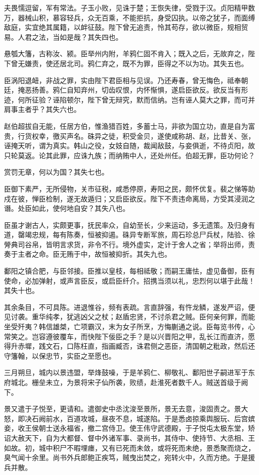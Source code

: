 \documentclass[12pt,UTF8]{ctexbook}
\begin{document}
夫畏懦逗留，军有常法。子玉小败，见诛于楚；王恢失律，受戮于汉。贞阳精甲数万，器械山积，慕容轻兵，众无百乘，不能拒抗，身受囚执。以帝之犹子，而面缚敌庭，实宜绝其属籍，以衅征鼓。陛下曾无追责，怜其苟存，欲以微臣，规相贸易。人君之法，当如是哉？其失四也。

悬瓠大籓，古称汝、颍。臣举州内附，羊鸦仁固不肯入；既入之后，无故弃之，陛下曾无嫌责，使还居北司。鸦仁弃之，既不为罪，臣得之不以为功。其失五也。

臣涡阳退衄，非战之罪，实由陛下君臣相与见误。乃还寿春，曾无悔色，祗奉朝廷，掩恶扬善。鸦仁自知弃州，切齿叹恨，内怀惭惧，遂启臣欲反。欲反当有形迹，何所征验？诬陷顿尔，陛下曾无辩究，默而信纳。岂有诬人莫大之罪，而可并肩事主者乎？其失六也。

赵伯超拔自无能，任居方伯，惟渔猎百姓，多蓄士马，非欲为国立功，直是自为富贵，行货权幸，徼买声名。硃异之徒，积受金贝，遂使咸称胡、赵，比昔关、张，诬掩天听，谓为真实。韩山之役，女妓自随，裁闻敌鼓，与妾俱逝，不待贞阳，故只轮莫返。论其此罪，应诛九族；而纳贿中人，还处州任。伯超无罪，臣功何论？

赏罚无章，何以为国？其失七也。

臣御下素严，无所侵物，关市征税，咸悉停原，寿阳之民，颇怀优复。裴之悌等助戍在彼，惮臣检制，遂无故遁归；又启臣欲反。陛下不责违命离局，方受其浸润之谮。处臣如此，使何地自安？其失八也。

臣虽才谢古人，实颇更事，抚民率众，自幼至长，少来运动，多无遗策。及归身有道，罄竭忠规，每有陈奏，恒被抑遏。硃异专断军旅，周石珍总尸兵杖，陆验、徐膋典司谷帛，皆明言求货，非令不行。境外虚实，定计于舍人之省；举将出师，责奏于主者之命。臣无贿于中，故恒被抑折。其失九也。

鄱阳之镇合肥，与臣邻接。臣推以皇枝，每相祗敬；而嗣王庸怯，虚见备御，臣有使命，必加弹射，或声言臣反，或启臣纤介。招携当须以礼，忠烈何以堪于此哉！其失十也。

其余条目，不可具陈。进退惟谷，频有表疏。言直辞强，有忤龙鳞，遂发严诏，便见讨袭。重华纯孝，犹逃凶父之杖；赵盾忠贤，不讨杀君之贼。臣何亲何罪，而能坐受歼夷？韩信雄桀，亡项霸汉，末为女子所烹，方悔蒯通之说。臣每览书传，心常笑之。岂容遵彼覆车，而快陛下佞臣之手？是以兴晋阳之甲，乱长江而直济，愿得升赤墀，践文石，口陈枉直，指画臧否，诛君侧之恶臣，清国朝之粃政，然后还守籓翰，以保忠节，实臣之至愿也。

三月朔旦，城内以景违盟，举烽鼓噪，于是羊鸦仁、柳敬礼、鄱阳世子嗣进军于东府城北。栅垒未立，为景将宋子仙所袭，败绩，赴淮死者数千人。贼送首级于阙下。

景又遣于子悦至，更请和。遣御史中丞沈浚至景所，景无去意，浚固责之。景大怒，即决石阙前水，百道攻城，昼夜不息，城遂陷。于是悉卤掠乘舆服玩、后宫嫔妾，收王侯朝士送永福省，撤二宫侍卫。使王伟守武德殿，于子悦屯太极东堂，矫诏大赦天下，自为大都督、督中外诸军事、录尚书，其侍中、使持节、大丞相、王如故。初，城中积尸不暇埋瘗，又有已死而未敛，或将死而未绝，景悉聚而烧之，臭气闻十余里。尚书外兵郎鲍正疾笃，贼曳出焚之，宛转火中，久而方绝。于是援兵并散。
\end{document}
